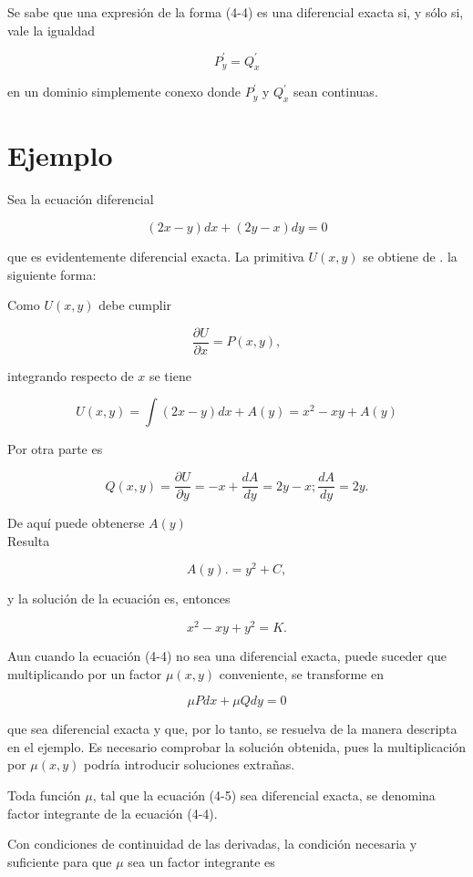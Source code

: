 \documentclass[10pt]{article}
\theoremstyle{plain}
\theoremstyle{definition}
\theoremstyle{remark}
\begin{document}
Se sabe que una expresión de la forma (4-4) es una diferencial exacta si, y sólo si, vale la igualdad

$$
P_{y}^{\prime}=Q_{x}^{\prime}
$$

en un dominio simplemente conexo donde $P_{y}^{\prime}$ y $Q_{x}^{\prime}$ sean continuas.

\section*{Ejemplo}
Sea la ecuación diferencial

$$
(2 x-y) d x+(2 y-x) d y=0
$$

que es evidentemente diferencial exacta. La primitiva $U(x, y)$ se obtiene de . la siguiente forma:

Como $U(x, y)$ debe cumplir

$$
\frac{\partial U}{\partial x}=P(x, y),
$$

integrando respecto de $x$ se tiene

$$
U(x, y)=\int(2 x-y) d x+A(y)=x^{2}-x y+A(y)
$$

Por otra parte es

$$
Q(x, y)=\frac{\partial U}{\partial y}=-x+\frac{d A}{d y}=2 y-x ; \frac{d A}{d y}=2 y .
$$


De aquí puede obtenerse $A(y)$\\
Resulta

$$
A(y) .=y^{2}+C,
$$

y la solución de la ecuación es, entonces

$$
x^{2}-x y+y^{2}=K .
$$

Aun cuando la ecuación (4-4) no sea una diferencial exacta, puede suceder que multiplicando por un factor $\mu(x, y)$ conveniente, se transforme en


\begin{equation*}
\mu P d x+\mu Q d y=0 \tag{$4\cdot5$}
\end{equation*}


que sea diferencial exacta y que, por lo tanto, se resuelva de la manera descripta en el ejemplo. Es necesario comprobar la solución obtenida, pues la multiplicación por $\mu(x, y)$ podría introducir soluciones extrañas.

Toda función $\mu$, tal que la ecuación (4-5) sea diferencial exacta, se denomina factor integrante de la ecuación (4-4).

Con condiciones de continuidad de las derivadas, la condición necesaria y suficiente para que $\mu$ sea un factor integrante es
\end{document}
